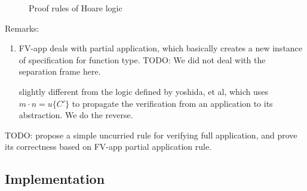 \begin{figure}
    \caption{Proof rules of Hoare logic}
    \label{fig:choarelogic}
\end{figure}

Remarks:
\begin{enumerate}
    \item FV-app deals with partial application, which basically creates a new instance of specification for function type. TODO: We did not deal with the separation frame here.
    
    slightly different from the logic defined by yoshida, et al, which uses $m\cdot n=u\{C'\}$ to propagate the verification from an application to its abstraction.  We do the reverse. 
\end{enumerate}


TODO: propose a simple uncurried rule for verifying full application, and prove its correctness based on FV-app partial application rule.

\subsection{Implementation}

